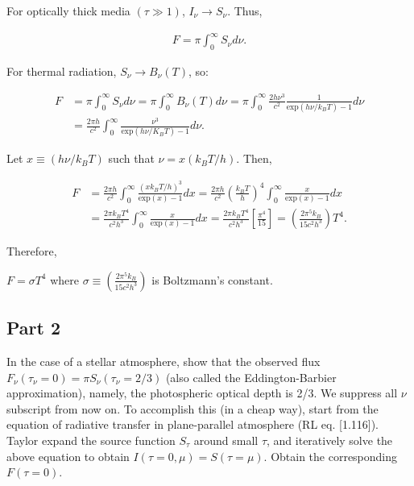\documentclass[12pt]{article}
\begin{document}
For optically thick media $(\tau \gg 1)$, $I_\nu \rightarrow S_\nu$. Thus,

\begin{align*}
F = \pi\int_0^{\infty}S_\nu d\nu.
\end{align*}

For thermal radiation, $S_\nu \rightarrow B_\nu(T)$, so:

\begin{equation*}
\begin{split}
F &= \pi\int_0^{\infty}S_\nu d\nu = \pi\int_0^{\infty}B_\nu(T) d\nu = \pi\int_0^{\infty}\frac{2h\nu^3}{c^2}\frac{1}{\mathrm{exp}(h\nu/k_BT) - 1}d\nu \\
&= \frac{2\pi h}{c^2}\int_0^{\infty}\frac{\nu^3}{\mathrm{exp}(h\nu/K_BT)-1}d\nu.
\end{split}
\end{equation*}

Let $x\equiv(h\nu/k_BT)$ such that $\nu = x(k_BT/h)$. Then,

\begin{equation*}
\begin{split}
F &= \frac{2\pi h}{c^2}\int_0^{\infty}\frac{(xk_BT/h)^3}{\mathrm{exp}(x)-1}dx = \frac{2\pi h}{c^2}\left(\frac{k_BT}{h}\right)^4\int_0^{\infty}\frac{x}{\mathrm{exp}(x)-1}dx \\
&= \frac{2\pi k_BT^4}{c^2h^3}\int_0^{\infty}\frac{x}{\mathrm{exp}(x)-1}dx = \frac{2\pi k_BT^4}{c^2h^3}\left[\frac{\pi^4}{15}\right] = \left(\frac{2\pi^5k_B}{15c^2h^3}\right)T^4.
\end{split}
\end{equation*}

Therefore,

$F = \sigma T^4$ where $\sigma \equiv \left(\frac{2\pi^5k_B}{15c^2h^3}\right)$ is Boltzmann's constant.

\subsection*{Part 2}

In the case of a stellar atmosphere, show that the observed flux $F_\nu(\tau_\nu = 0) = {\pi}S_{\nu}(\tau_{\nu} = 2/3)$ (also called the Eddington-Barbier approximation), namely, the photospheric optical depth is 2/3. We suppress all $\nu$ subscript from now on. To accomplish this (in a cheap way), start from the equation of radiative transfer in plane-parallel atmosphere (RL eq. [1.116]). Taylor expand the source function $S_\tau$ around small $\tau$, and iteratively solve the above equation to obtain $I(\tau=0,\mu) = S(\tau = \mu)$. Obtain the corresponding $F(\tau=0)$.
\end{document}
